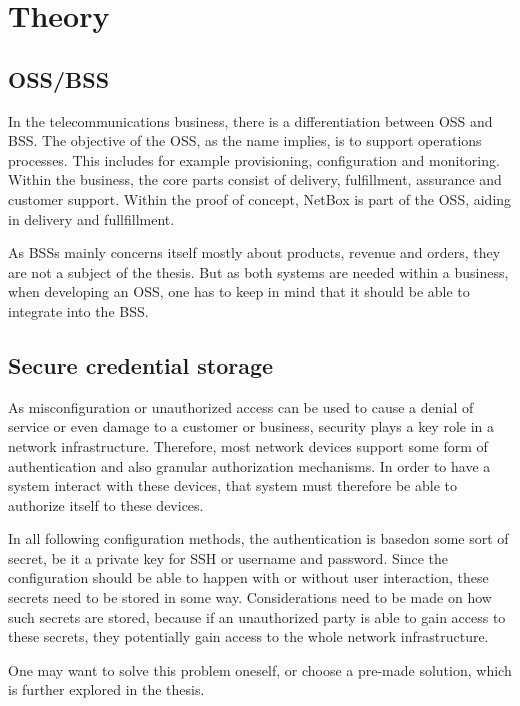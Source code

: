 \chapter{\label{theory}Theory}
\thispagestyle{fancy}


\section{OSS/BSS}

In the telecommunications business, there is a differentiation between \acrlong{OSS} and \acrlong{BSS}.
The objective of the \acrshort{OSS}, as the name implies, is to support operations processes.
This includes for example provisioning, configuration and monitoring. Within the business,
the core parts consist of delivery, fulfillment, assurance and customer support.
Within the proof of concept, NetBox is part of the OSS, aiding in delivery and fullfillment.

As \acrshort{BSS}s mainly concerns itself mostly about products, revenue and orders,
they are not a subject of the thesis. But as both systems are needed within a business,
when developing an \acrshort{OSS}, one has to keep in mind that it should be able to
integrate into the \acrshort{BSS}.

\section{Secure credential storage}

As misconfiguration or unauthorized access can be used to cause a denial of service or
even damage to a customer or business, security plays a key role in a network infrastructure.
Therefore, most network devices support some form of authentication and also granular authorization
mechanisms. In order to have a system interact with these devices, that system must therefore
be able to authorize itself to these devices.

In all following configuration methods, the authentication is basedon  some sort of secret,
be it a private key for SSH or username and password. Since the configuration should be
able to happen with or without user interaction, these secrets need to be stored in some way.
Considerations need to be made on how such secrets are stored, because if an unauthorized party
is able to gain access to these secrets, they potentially gain access to the whole network infrastructure.

One may want to solve this problem oneself, or choose a pre-made solution, which is further explored
in the thesis.


